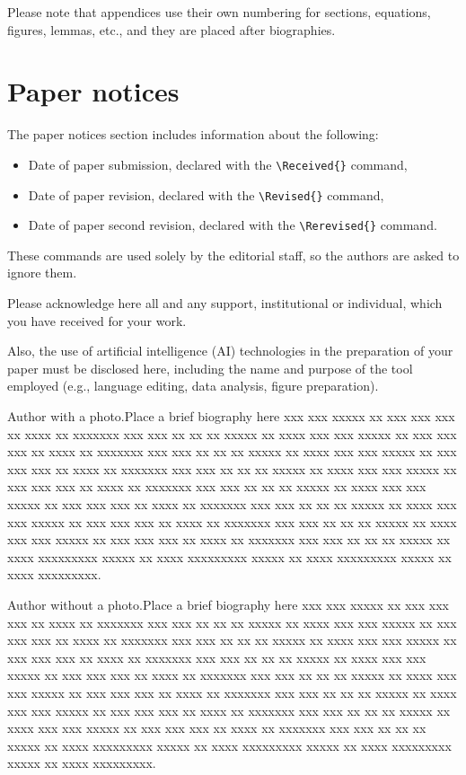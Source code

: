 \documentclass{amcs}
\begin{document}
Please note that appendices use their own numbering for sections, equations, figures, lemmas, etc., and they are placed after biographies.

\section{Paper notices}
The paper notices section includes information about the following:
\begin{itemize}
  \item
    Date of paper submission, declared with the \verb+\Received{}+ command,
  \item
    Date of paper revision, declared with the \verb+\Revised{}+ command,
  \item
    Date of paper second revision, declared with the \verb+\Rerevised{}+ command.
\end{itemize}
These commands are used solely by the editorial staff, so the authors are asked to ignore them.

\begin{acknowledgment}
Please acknowledge here all and any support, institutional or individual, which you have received for your work. 

Also, the use of artificial intelligence (AI) technologies in the preparation of your paper must be disclosed here, including the name and purpose of the tool employed (e.g., language editing, data analysis, figure preparation).
\end{acknowledgment}



\begin{biography}[photo]{Author with a photo.}Place a brief biography here xxx xxx xxxxx xx xxx xxx xxx xx xxxx xx xxxxxxx xxx xxx xx xx xx xxxxx xx xxxx xxx xxx xxxxx xx xxx xxx xxx xx xxxx xx xxxxxxx xxx xxx xx xx xx xxxxx xx xxxx xxx xxx xxxxx xx xxx xxx xxx xx xxxx xx xxxxxxx xxx xxx xx xx xx xxxxx xx xxxx xxx xxx xxxxx xx xxx xxx xxx xx xxxx xx xxxxxxx xxx xxx xx xx xx xxxxx xx xxxx xxx xxx xxxxx xx xxx xxx xxx xx xxxx xx xxxxxxx xxx xxx xx xx xx xxxxx xx xxxx xxx xxx xxxxx xx xxx xxx xxx xx xxxx xx xxxxxxx xxx xxx xx xx xx xxxxx xx xxxx xxx xxx xxxxx xx xxx xxx xxx xx xxxx xx xxxxxxx xxx xxx xx xx xx xxxxx xx xxxx xxxxxxxxx xxxxx xx xxxx xxxxxxxxx xxxxx xx xxxx xxxxxxxxx xxxxx xx xxxx xxxxxxxxx.
\end{biography}

\begin{biography}[]{Author without a photo.}Place a brief biography here xxx xxx xxxxx xx xxx xxx xxx xx xxxx xx xxxxxxx xxx xxx xx xx xx xxxxx xx xxxx xxx xxx xxxxx xx xxx xxx xxx xx xxxx xx xxxxxxx xxx xxx xx xx xx xxxxx xx xxxx xxx xxx xxxxx xx xxx xxx xxx xx xxxx xx xxxxxxx xxx xxx xx xx xx xxxxx xx xxxx xxx xxx xxxxx xx xxx xxx xxx xx xxxx xx xxxxxxx xxx xxx xx xx xx xxxxx xx xxxx xxx xxx xxxxx xx xxx xxx xxx xx xxxx xx xxxxxxx xxx xxx xx xx xx xxxxx xx xxxx xxx xxx xxxxx xx xxx xxx xxx xx xxxx xx xxxxxxx xxx xxx xx xx xx xxxxx xx xxxx xxx xxx xxxxx xx xxx xxx xxx xx xxxx xx xxxxxxx xxx xxx xx xx xx xxxxx xx xxxx xxxxxxxxx xxxxx xx xxxx xxxxxxxxx xxxxx xx xxxx xxxxxxxxx xxxxx xx xxxx xxxxxxxxx.
\end{biography}
\end{document}
